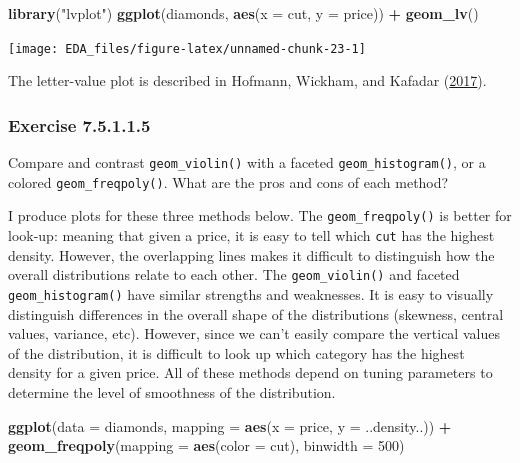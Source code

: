 \documentclass[]{book}
\newenvironment{Shaded}{\begin{snugshade}}{\end{snugshade}}
\newcommand{\DataTypeTok}[1]{\textcolor[rgb]{0.13,0.29,0.53}{#1}}
\newcommand{\DecValTok}[1]{\textcolor[rgb]{0.00,0.00,0.81}{#1}}
\newcommand{\KeywordTok}[1]{\textcolor[rgb]{0.13,0.29,0.53}{\textbf{#1}}}
\newcommand{\NormalTok}[1]{#1}
\newcommand{\OperatorTok}[1]{\textcolor[rgb]{0.81,0.36,0.00}{\textbf{#1}}}
\newcommand{\StringTok}[1]{\textcolor[rgb]{0.31,0.60,0.02}{#1}}
\theoremstyle{plain}
\theoremstyle{remark}
\begin{document}
\begin{Shaded}
\begin{Highlighting}[]
\KeywordTok{library}\NormalTok{(}\StringTok{"lvplot"}\NormalTok{)}
\KeywordTok{ggplot}\NormalTok{(diamonds, }\KeywordTok{aes}\NormalTok{(}\DataTypeTok{x =}\NormalTok{ cut, }\DataTypeTok{y =}\NormalTok{ price)) }\OperatorTok{+}
\StringTok{  }\KeywordTok{geom_lv}\NormalTok{()}
\end{Highlighting}
\end{Shaded}

\begin{center}\texttt{[image: EDA\_files/figure-latex/unnamed-chunk-23-1]} \end{center}

The letter-value plot is described in Hofmann, Wickham, and Kafadar (\protect\hyperlink{ref-HofmannWickhamKafadar2017}{2017}).

\hypertarget{exercise-7.5.1.1.5}{%
\subsubsection*{\texorpdfstring{Exercise {7.5.1.1.5}}{Exercise 7.5.1.1.5}}\label{exercise-7.5.1.1.5}}

Compare and contrast \texttt{geom\_violin()} with a faceted \texttt{geom\_histogram()}, or a colored \texttt{geom\_freqpoly()}.
What are the pros and cons of each method?

I produce plots for these three methods below. The \texttt{geom\_freqpoly()} is better
for look-up: meaning that given a price, it is easy to tell which \texttt{cut} has the
highest density. However, the overlapping lines makes it difficult to distinguish how the overall distributions relate to each other.
The \texttt{geom\_violin()} and faceted \texttt{geom\_histogram()} have similar strengths and
weaknesses.
It is easy to visually distinguish differences in the overall shape of the
distributions (skewness, central values, variance, etc).
However, since we can't easily compare the vertical values of the distribution,
it is difficult to look up which category has the highest density for a given price.
All of these methods depend on tuning parameters to determine the level of
smoothness of the distribution.

\begin{Shaded}
\begin{Highlighting}[]
\KeywordTok{ggplot}\NormalTok{(}\DataTypeTok{data =}\NormalTok{ diamonds, }\DataTypeTok{mapping =} \KeywordTok{aes}\NormalTok{(}\DataTypeTok{x =}\NormalTok{ price, }\DataTypeTok{y =}\NormalTok{ ..density..)) }\OperatorTok{+}
\StringTok{  }\KeywordTok{geom_freqpoly}\NormalTok{(}\DataTypeTok{mapping =} \KeywordTok{aes}\NormalTok{(}\DataTypeTok{color =}\NormalTok{ cut), }\DataTypeTok{binwidth =} \DecValTok{500}\NormalTok{)}
\end{Highlighting}
\end{Shaded}
\end{document}
